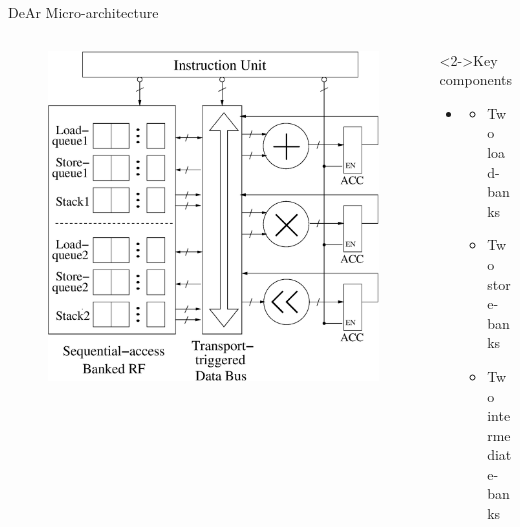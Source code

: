 \documentclass{beamer}
\begin{document}
\begin{CJK}{UTF8}{bkai}
            \begin{frame}{DeAr Micro-architecture}
                \begin{columns}
                    \begin{column}{0.6\textwidth}
                        \begin{figure}[!ht] 
                            \centering
                            \includegraphics[width=1.0\textwidth]{./figs/micro.eps}
                        \end{figure}
                    \end{column}
                    \begin{column}{0.35\textwidth}
                        \begin{block}<2->{Key components}
                            \begin{itemize}
                                \item <3->
                                {
                                    \begin{itemize}
                                        \item Two load-banks
                                        \item Two store-banks
                                        \item Two intermediate-banks

\end{itemize}}
\end{itemize}
\end{block}
\end{column}
\end{columns}
\end{frame}
\end{CJK}
\end{document}
